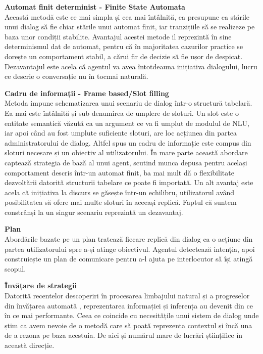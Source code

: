 \textbf{Automat finit determinist - Finite State Automata}\\
Această metodă este ce mai simpla și cea mai întâlnită, ea presupune ca stările unui dialog să fie chiar stările unui automat finit, iar tranzițiile să se realizeze pe baza unor condiții stabilite. Avantajul acestei metode il reprezintă în sine determinismul dat de automat, pentru că în majoritatea cazurilor practice se dorește un comportament stabil, a cărui fir de decizie să fie ușor de despicat. Dezavantajul este acela că agentul va avea întotdeauna inițiativa dialogului, lucru ce descrie o conversație nu în tocmai naturală.
	
\textbf{Cadru de informații - Frame based/Slot filling}\\
Metoda impune schematizarea unui scenariu de dialog într-o structură tabelară. Ea mai este întâlnită și sub denumirea de umplere de sloturi. Un slot este o entitate semantică văzută ca un argument ce va fi umplut de modulul de NLU, iar apoi când au fost umplute suficiente sloturi, are loc acțiunea din partea administratorului de dialog. Altfel spus un cadru de informație este compus din sloturi necesare și un obiectiv al utilizatorului. În mare parte această abordare captează strategia de bază al unui agent, scutind munca depusa pentru același comportament descris într-un automat finit, ba mai mult dă o flexibilitate dezvoltării datorită structurii tabelare ce poate fi importată. Un alt avantaj este acela că inițiativa la discurs se găsește într-un echilibru, utilizatorul având posibilitatea să ofere mai multe sloturi în aceeași replică. Faptul că suntem constrânși la un singur scenariu reprezintă un dezavantaj.

\textbf{Plan}\\
Abordările bazate pe un plan tratează fiecare replică din dialog ca o acțiune din partea utilizatorului spre a-și atinge obiectivul. Agentul detectează intenția, apoi construiește un plan de comunicare pentru a-l ajuta pe interlocutor să își atingă scopul.

\textbf{Învățare de strategii}\\
Datorită recentelor descoperiri în procesarea limbajului natural \cite{mikolov2013} și a progreselor din învățarea automată \cite{adam2015}, reprezentarea informației și inferența au devenit din ce în ce mai performante. Ceea ce coincide cu necesitățile unui sistem de dialog unde știm ca avem nevoie de o metodă care să poată reprezenta contextul și încă una de a rezona pe baza acestuia. De aici și numărul mare de lucrări științifice în această direcție.

